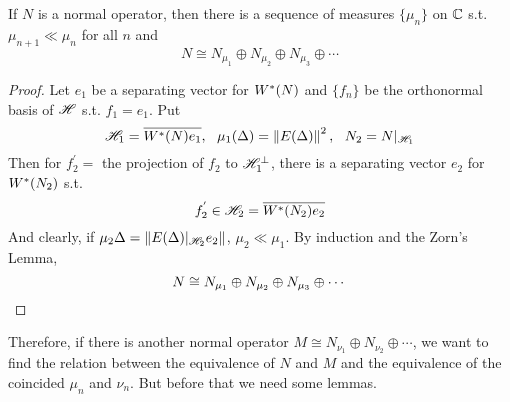 \documentclass[a4paper,11pt]{report}
\begin{document}
\begin{thm} \label{thm10}
	If $N$ is a normal operator, then there is a sequence of measures $\{\mu_n\}$ on $\mathbb{C}$ s.t. $\mu_{n+1} \ll \mu_{n}$ for all $n$ and 
	\begin{equation*}
		N \cong N_{\mu_1} \oplus N_{\mu_2} \oplus N_{\mu_3} \oplus \cdots
	\end{equation*}
\end{thm}
\begin{proof}
	Let $e_1$ be a separating vector for $W^{*}(N)$ and $\{f_n\}$ be the orthonormal basis of $\mathscr{H}$ s.t. $f_1 = e_1$. Put
	\begin{equation*}
		\mathscr{H}_1 = \overline{W^{*}(N)e_1},~~\mu_1(\Delta) = \left\lVert E(\Delta)\right\lVert^2,~~ N_2 = N|_{\mathscr{H}_1}
	\end{equation*}
	Then for $f_2^{'} = $ the projection of $f_2$ to $\mathscr{H}_1^{\bot}$, there is a separating vector $e_2$ for $W^{*}(N_2)$ s.t. 
	\begin{equation*}
		f_2^{'} \in \mathscr{H}_2 = \overline{W^{*}(N_2)e_2}
	\end{equation*} 
	And clearly, if $\mu_2{\Delta} = \left\lVert E(\Delta)|_{\mathscr{H}_2}e_2\right\lVert$, $\mu_2 \ll \mu_1$. By induction and the Zorn's Lemma, 
	\begin{equation*}
		N \cong N_{\mu_1} \oplus N_{\mu_2} \oplus N_{\mu_3} \oplus \cdots \qedhere
	\end{equation*}
\end{proof}

Therefore, if there is another normal operator $M \cong N_{\nu_1} \oplus N_{\nu_2} \oplus \cdots$, we want to find the relation between the equivalence of $N$ and $M$ and the equivalence of the coincided $\mu_n$ and $\nu_n$. But before that we need some lemmas.
\end{document}
